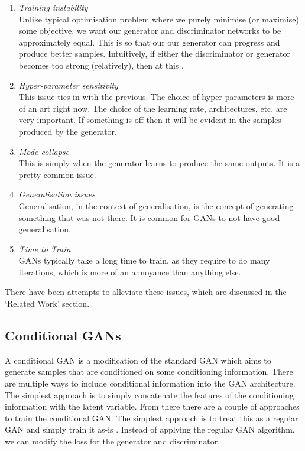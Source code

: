 \documentclass{report}
\theoremstyle{plain}
\theoremstyle{definition}
\theoremstyle{remark}
\numberwithin{equation}{section}
\numberwithin{figure}{section}
\newcommand{\<}{\langle}
\renewcommand{\>}{\rangle}
\begin{document}
\begin{enumerate}
    \item \textit{Training instability}\\
        Unlike typical optimisation problem where we purely minimise (or maximise) some objective, we want our generator and discriminator networks to be approximately equal. This is so that our our generator can progress and produce better samples. Intuitively, if either the discriminator or generator becomes too strong (relatively), then at this . 
    \item \textit{Hyper-parameter sensitivity}\\
        This issue ties in with the previous. The choice of hyper-parameters is more of an art right now. The choice of the learning rate, architectures, etc. are very important. If something is off then it will be evident in the samples produced by the generator.
    \item \textit{Mode collapse}\\
        This is simply when the generator learns to produce the same outputs. It is a pretty common issue.
    \item \textit{Generalisation issues}\\
        Generalisation, in the context of generalisation, is the concept of generating something that was not there. It is common for GANs to not have good generalisation.
    \item \textit{Time to Train}\\
        GANs typically take a long time to train, as they require to do many iterations, which is more of an annoyance than anything else.
\end{enumerate}

There have been attempts to alleviate these issues, which are discussed in the `Related Work' section.

\subsection{Conditional GANs}
A conditional GAN is a modification of the standard GAN which aims to generate samples that are conditioned on some conditioning information. There are multiple ways to include conditional information into the GAN architecture. The simplest approach is to simply concatenate the features of the conditioning information with the latent variable. From there there are a couple of approaches to train the conditional GAN. The simplest approach is to treat this as a regular GAN and simply train it as-is \cite{mirza_conditional_2014}. Instead of applying the regular GAN algorithm, we can modify the loss for the generator and discriminator.
\end{document}
